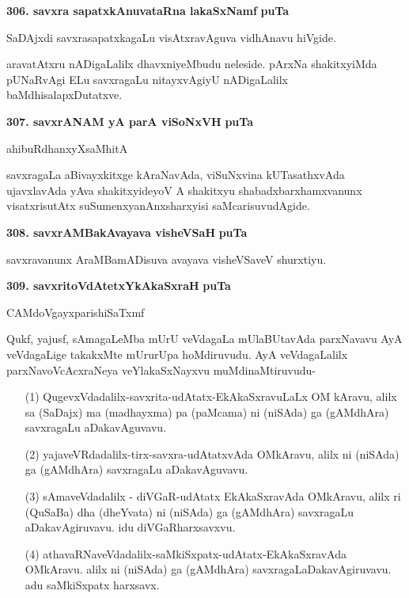 \medskip
\noindent
\textbf{306. savxra sapatxkAnuvataRna lakaSxNamf} \hfill {\bf puTa }

\smallskip
SaDAjxdi savxrasapatxkagaLu visAtxravAguva vidhAnavu hiVgide.

aravatAtxru nADigaLalilx dhavxniyeMbudu neleside. pArxNa shakitxyiMda pUNaRvAgi ELu savxragaLu nitayxvAgiyU nADigaLalilx baMdhisalapxDutatxve.

\eject

\textbf{307. savxrANAM yA parA viSoNxVH} \hfill {\bf puTa }

\hfill ahibuRdhanxyXsaMhitA

\smallskip
savxragaLa aBivayxkitxge kAraNavAda, viSuNxvina kUTasathxvAda ujavxlavAda yAva shakitxyideyoV A shakitxyu shabadxbarxhamxvanunx visatxrisutAtx suSumenxyanAnxsharxyisi saMcarisuvudAgide.

\medskip
\noindent
\textbf{308. savxrAMBakAvayava visheVSaH} \hfill {\bf puTa }

\smallskip
savxravanunx AraMBamADisuva avayava visheVSaveV shurxtiyu.

\medskip
\noindent
\textbf{309. savxritoVdAtetxYkAkaSxraH} \hfill {\bf puTa }

\hfill CAMdoVgayxparishiSaTxmf

\smallskip
Qukf, yajusf, sAmagaLeMba mUrU veVdagaLa mUlaBUtavAda parxNavavu AyA veVdagaLige takakxMte mUrurUpa hoMdiruvudu. AyA veVdagaLalilx parxNavoVcAcxraNeya veYlakaSxNayxvu muMdinaMtiruvudu-

\begin{itemize}
\item[(1)] QugevxVdadalilx-savxrita-udAtatx-EkAkaSxravuLaLx OM kAravu, alilx sa (SaDajx) ma (madhayxma) pa (paMcama) ni (niSAda) ga (gAMdhAra) savxragaLu aDakavAguvavu.

\item[(2)] yajaveVRdadalilx-tirx-savxra-udAtatxvAda OMkAravu, alilx ni (niSAda) ga (gAMdhAra) savxragaLu aDakavAguvavu.

\item[(3)] sAmaveVdadalilx - diVGaR-udAtatx EkAkaSxravAda OMkAravu, alilx ri (QuSaBa) dha (dheYvata) ni (niSAda) ga (gAMdhAra) savxragaLu aDakavAgiruvavu. idu diVGaRharxsavxvu.

\item[(4)] athavaRNaveVdadalilx-saMkiSxpatx-udAtatx-EkAkaSxravAda OMkAravu. alilx ni (niSAda) ga (gAMdhAra) savxragaLaDakavAgiruvavu. adu saMkiSxpatx harxsavx. 

\end{itemize}

